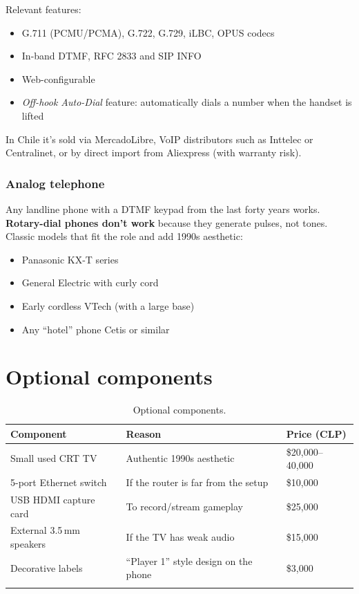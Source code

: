 Relevant features:

\begin{itemize}
  \item G.711 (PCMU/PCMA), G.722, G.729, iLBC, OPUS codecs
  \item In-band DTMF, RFC 2833 and SIP INFO
  \item Web-configurable
  \item \emph{Off-hook Auto-Dial} feature: automatically dials a number when the handset is lifted
\end{itemize}

In Chile it's sold via MercadoLibre, VoIP distributors such as Inttelec or Centralinet, or by direct import from Aliexpress (with warranty risk).

\subsubsection{Analog telephone}

Any landline phone with a DTMF keypad from the last forty years works. \textbf{Rotary-dial phones don't work} because they generate pulses, not tones. Classic models that fit the role and add 1990s aesthetic:

\begin{itemize}
  \item Panasonic KX-T series
  \item General Electric with curly cord
  \item Early cordless VTech (with a large base)
  \item Any ``hotel'' phone Cetis or similar
\end{itemize}

\section{Optional components}

\begin{longtable}{p{} p{} R{0.15\textwidth}}
\toprule
\textbf{Component} & \textbf{Reason} & \textbf{Price (CLP)} \\
\midrule
\endhead
Small used CRT TV & Authentic 1990s aesthetic & \$20,000--40,000 \\
5-port Ethernet switch & If the router is far from the setup & \$10,000 \\
USB HDMI capture card & To record/stream gameplay & \$25,000 \\
External 3.5\,mm speakers & If the TV has weak audio & \$15,000 \\
Decorative labels & ``Player 1'' style design on the phone & \$3,000 \\
\bottomrule
\caption{Optional components.}\\
\end{longtable}


